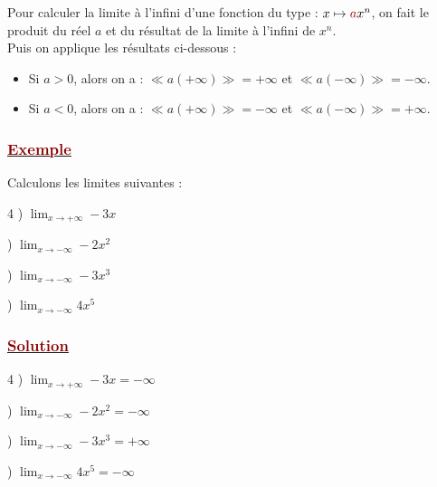 \documentclass[12pt,a4paper]{article}
\begin{document}
Pour calculer la limite à l'infini d'une fonction du type : $x \mapsto {\color{darkred}a}x^n$, on fait le produit du réel {\color{darkred}$a$} et du résultat de la limite à l'infini de $x^n$. \\
Puis on applique les résultats ci-dessous :
\begin{itemize}
    \item Si {\color{darkred}$a > 0$}, alors on a : $\ll a(+\infty) \gg = +\infty$ et $\ll a(-\infty) \gg = -\infty$.
    \item Si {\color{darkred}$a < 0$}, alors on a : $\ll a(+\infty) \gg = -\infty$ et $\ll a(-\infty) \gg = +\infty$.
\end{itemize}

\subsubsection*{\underline{\textcolor{darkred}{ Exemple }}}

Calculons les limites suivantes :

\begin{multicols}{4}
) $\displaystyle \lim_{x \to +\infty} -3x$

\columnbreak

) $\displaystyle \lim_{x \to -\infty} -2x^2$

\columnbreak

) $\displaystyle \lim_{x \to -\infty} -3x^3$

\columnbreak

) $\displaystyle \lim_{x \to -\infty} 4x^5$
\end{multicols}

\subsubsection*{\underline{\textcolor{darkred}{ Solution }}}

\begin{multicols}{4}
) $\displaystyle \lim_{x \to +\infty} -3x = -\infty$

\columnbreak

) $\displaystyle \lim_{x \to -\infty} -2x^2 = -\infty$

\columnbreak

) $\displaystyle \lim_{x \to -\infty} -3x^3 = +\infty$

\columnbreak

) $\displaystyle \lim_{x \to -\infty} 4x^5 = -\infty$
\end{multicols}
\end{document}
